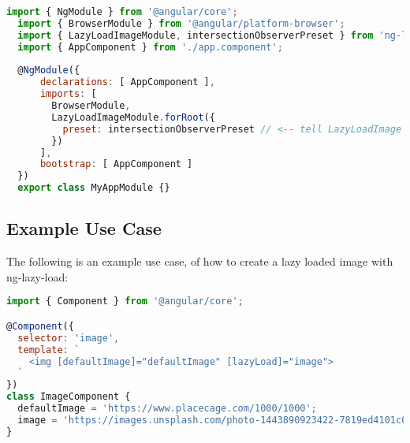 
\begin{lstlisting}[language=javascript]
  import { NgModule } from '@angular/core';
  import { BrowserModule } from '@angular/platform-browser';
  import { LazyLoadImageModule, intersectionObserverPreset } from 'ng-lazyload-image'; // <-- include intersectionObserverPreset
  import { AppComponent } from './app.component';
  
  @NgModule({
      declarations: [ AppComponent ],
      imports: [
        BrowserModule,
        LazyLoadImageModule.forRoot({
          preset: intersectionObserverPreset // <-- tell LazyLoadImage that you want to use IntersectionObserver
        })
      ],
      bootstrap: [ AppComponent ]
  })
  export class MyAppModule {}
\end{lstlisting}

\subsection{Example Use Case}
The following is an example use case, of how to create a lazy loaded image 
with ng-lazy-load: 
\begin{lstlisting}[language=javascript]
import { Component } from '@angular/core';

@Component({
  selector: 'image',
  template: `
    <img [defaultImage]="defaultImage" [lazyLoad]="image">
  `
})
class ImageComponent {
  defaultImage = 'https://www.placecage.com/1000/1000';
  image = 'https://images.unsplash.com/photo-1443890923422-7819ed4101c0?fm=jpg';
}
\end{lstlisting}